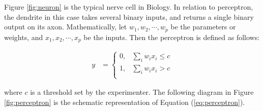 Figure \ref{fig:neuron} is the typical nerve cell in Biology. In relation to perceptron, the dendrite in this case takes several binary inputs, and returns a single binary output on its axon. Mathematically, let $w_1,w_2,\cdots,w_p$ be the parameters or weights, and $x_1,x_2,\cdots, x_p$ be the inputs. Then the perceptron is defined as follows:

\begin{equation}
\label{eq:perceptron}
\begin{aligned}
y&=
\begin{cases}
0,& \sum_{i}w_i x_i\leq c\\
1,& \sum_{i}w_i x_i> c\\
\end{cases}
\end{aligned}
\end{equation}

where $c$ is a threshold set by the experimenter. The following diagram in Figure \ref{fig:perceptron} is the schematic representation of Equation (\ref{eq:perceptron}).

